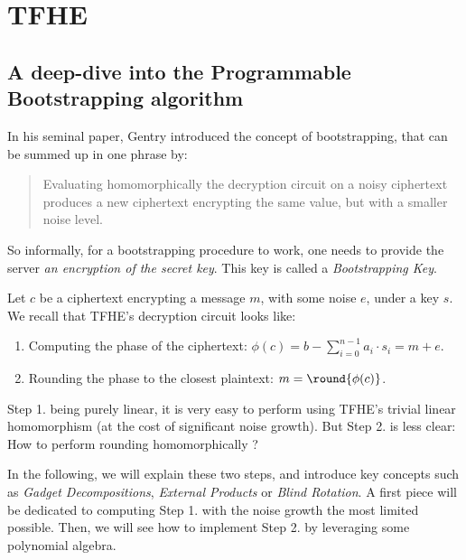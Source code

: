 
\section{TFHE}






\subsection{A deep-dive into the Programmable Bootstrapping algorithm}

In his seminal paper, Gentry introduced the concept of bootstrapping, that can be summed up in one phrase by:

\begin{quote}
	Evaluating homomorphically the decryption circuit on a noisy ciphertext produces a new ciphertext encrypting the same value, but with a smaller noise level.
\end{quote}

So informally, for a bootstrapping procedure to work, one needs to provide the server \textit{an encryption of the secret key}. This key is called a \textit{Bootstrapping Key}.



Let $c$ be a ciphertext encrypting a message $m$, with some noise $e$, under a key $s$. We recall that TFHE's decryption circuit looks like:

\begin{enumerate}
	\item Computing the phase of the ciphertext: $\phi(c) = b - \sum_{i=0}^{n-1} a_i \cdot s_i = m + e$.
	\item Rounding the phase to the closest plaintext: $m = \round{\phi(c)}$.
\end{enumerate}


Step 1. being purely linear, it is very easy to perform using TFHE's trivial linear homomorphism (at the cost of significant noise growth). But Step 2. is less clear: How to perform rounding homomorphically ? 

In the following, we will explain these two steps, and introduce key concepts such as \textit{Gadget Decompositions}, \textit{External Products} or \textit{Blind Rotation}. A first piece will be dedicated to computing Step 1. with the noise growth the most limited possible. Then, we will see how to implement Step 2. by leveraging some polynomial algebra.

